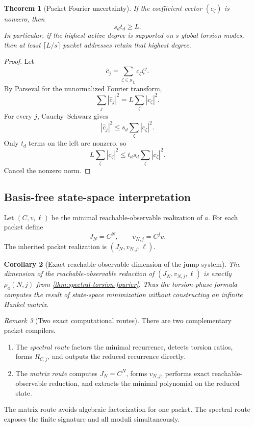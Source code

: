 \documentclass[11pt]{article}
\newtheorem{theorem}{Theorem}[section]\newtheorem{proposition}[theorem]{Proposition}\newtheorem{lemma}[theorem]{Lemma}\newtheorem{corollary}[theorem]{Corollary}
\theoremstyle{definition}\newtheorem{definition}[theorem]{Definition}\newtheorem{example}[theorem]{Example}\newtheorem{construction}[theorem]{Construction}\newtheorem{algorithm}[theorem]{Algorithm}\newtheorem{conjecture}[theorem]{Conjecture}\newtheorem{problem}[theorem]{Problem}
\theoremstyle{remark}\newtheorem{remark}[theorem]{Remark}\newtheorem{boundary}[theorem]{Boundary}\newtheorem{certificate}[theorem]{Computational Certificate}\newtheorem{classical}[theorem]{Classical Input}\newtheorem{principle}[theorem]{Structural Principle}
\begin{document}
\begin{theorem}[Packet Fourier uncertainty]
\label{thm:packet-uncertainty}
If the coefficient vector $(c_\zeta)$ is nonzero, then
\[
 \boxed{s_dt_d\geq L.}
\]
In particular, if the highest active degree is supported on $s$ global torsion modes, then at least $\lceil L/s\rceil$ packet addresses retain that highest degree.
\end{theorem}

\begin{proof}
Let
\[
 \widehat c_j=\sum_{\zeta\in\mu_L}c_\zeta\zeta^j.
\]
By Parseval for the unnormalized Fourier transform,
\[
 \sum_j|\widehat c_j|^2=L\sum_\zeta|c_\zeta|^2.
\]
For every $j$, Cauchy--Schwarz gives
\[
 |\widehat c_j|^2
 \leq
 s_d\sum_\zeta|c_\zeta|^2.
\]
Only $t_d$ terms on the left are nonzero, so
\[
 L\sum_\zeta|c_\zeta|^2
 \leq
 t_ds_d\sum_\zeta|c_\zeta|^2.
\]
Cancel the nonzero norm.
\end{proof}

\subsection{Basis-free state-space interpretation}
Let $(C,v,\ell)$ be the minimal reachable-observable realization of $a$.  For each packet define
\[
 J_N=C^N,
 \qquad
 v_{N,j}=C^jv.
\]
The inherited packet realization is $(J_N,v_{N,j},\ell)$.

\begin{corollary}[Exact reachable-observable dimension of the jump system]
The dimension of the reachable-observable reduction of $(J_N,v_{N,j},\ell)$ is exactly $\rho_a(N,j)$ from \cref{thm:spectral-torsion-fourier}.  Thus the torsion-phase formula computes the result of state-space minimization without constructing an infinite Hankel matrix.
\end{corollary}

\begin{remark}[Two exact computational routes]
There are two complementary packet compilers.
\begin{enumerate}
\item The \emph{spectral route} factors the minimal recurrence, detects torsion ratios, forms $R_{C,j}$, and outputs the reduced recurrence directly.
\item The \emph{matrix route} computes $J_N=C^N$, forms $v_{N,j}$, performs exact reachable-observable reduction, and extracts the minimal polynomial on the reduced state.
\end{enumerate}
The matrix route avoids algebraic factorization for one packet.  The spectral route exposes the finite signature and all moduli simultaneously.
\end{remark}
\end{document}

